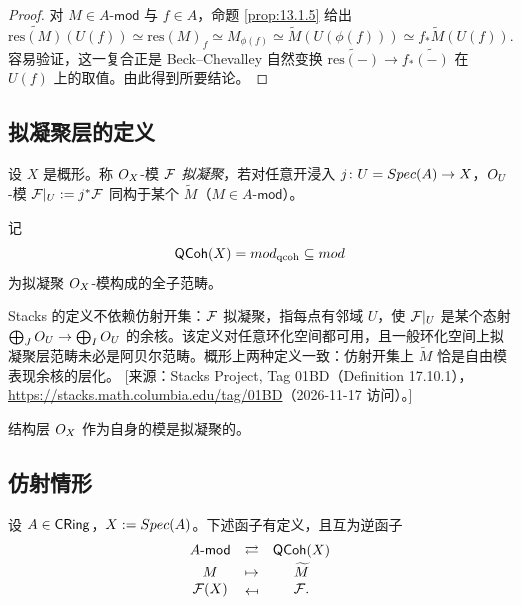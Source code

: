 \begin{proof}
对 $M\in A\text{-}\mathsf{mod}$ 与 $f\in A$，命题 \ref{prop:13.1.5} 给出
\[
\widetilde{\mathrm{res}(M)}(U(f))\simeq\mathrm{res}(M)_f\simeq M_{\phi(f)}\simeq\widetilde{M}(U(\phi(f)))\simeq f_*\widetilde{M}(U(f)).
\]
容易验证，这一复合正是 Beck--Chevalley 自然变换 $\widetilde{\mathrm{res}(-)}\to f_*\widetilde{(-)}$ 在 $U(f)$ 上的取值。由此得到所要结论。
\end{proof}

\subsection{拟凝聚层的定义}\label{sec:13.2}

\begin{definition}\label{def:13.2.1}
设 $X$ 是概形。称 $O_X$-模 $\mathcal{F}$ \emph{拟凝聚}，若对任意开浸入 $j\colon U=Spec(A)\to X$，$O_U$-模 $\mathcal{F}|_U:=j^*\mathcal{F}$ 同构于某个 $\widetilde{M}$（$M\in A\text{-}\mathsf{mod}$）。

记
\[
\mathsf{QCoh}(X)=mod_{\mathrm{qcoh}}\subseteq mod
\]
为拟凝聚 $O_X$-模构成的全子范畴。
\end{definition}

\begin{yizhu}
Stacks 的定义不依赖仿射开集：$\mathcal{F}$ 拟凝聚，指每点有邻域 $U$，使 $\mathcal{F}|_U$ 是某个态射 $\bigoplus_JO_U\to\bigoplus_IO_U$ 的余核。该定义对任意环化空间都可用，且一般环化空间上拟凝聚层范畴未必是阿贝尔范畴。概形上两种定义一致：仿射开集上 $\widetilde{M}$ 恰是自由模表现余核的层化。
[来源：Stacks Project, Tag 01BD（Definition 17.10.1），\url{https://stacks.math.columbia.edu/tag/01BD}（2026-11-17 访问）。]
\end{yizhu}

\begin{example}\label{ex:13.2.2}
结构层 $O_X$ 作为自身的模是拟凝聚的。
\end{example}

\subsection{仿射情形}\label{sec:13.3}

\begin{proposition}\label{prop:13.3.1}
设 $A\in\mathsf{CRing}$，$X:=Spec(A)$。下述函子有定义，且互为逆函子
\[
\begin{array}{ccc}
A\text{-}\mathsf{mod} & \rightleftarrows & \mathsf{QCoh}(X)\\[0.5ex]
M & \mapsto & \widetilde{M}\\
\cF(X) & \mapsfrom & \cF.
\end{array}
\]
\end{proposition}

